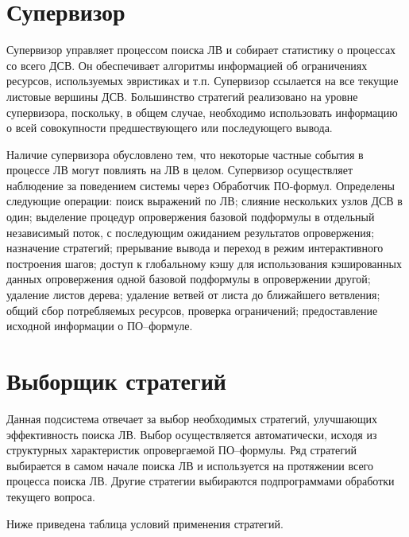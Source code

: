 \section{Супервизор}
Супервизор управляет процессом поиска ЛВ и собирает статистику о процессах со всего ДСВ. Он обеспечивает алгоритмы информацией об ограничениях ресурсов, используемых эвристиках и т.п. Супервизор ссылается на все текущие листовые вершины ДСВ. Большинство стратегий реализовано на уровне супервизора, поскольку, в общем случае, необходимо использовать информацию о всей совокупности предшествующего или последующего вывода.

Наличие супервизора обусловлено тем, что некоторые частные события в процессе ЛВ могут повлиять на ЛВ в целом. Супервизор осуществляет наблюдение за поведением системы через Обработчик ПО-формул. Определены следующие операции: поиск выражений по ЛВ; слияние нескольких узлов ДСВ в один; выделение процедур опровержения базовой подформулы в отдельный независимый поток, с последующим ожиданием результатов опровержения; назначение стратегий; прерывание вывода и переход в режим интерактивного построения шагов; доступ к глобальному кэшу для использования кэшированных данных опровержения одной базовой подформулы в опровержении другой; удаление листов дерева; удаление ветвей от листа до ближайшего ветвления; общий сбор потребляемых ресурсов, проверка ограничений; предоставление исходной информации о ПО--формуле.



\section{Выборщик стратегий}
Данная подсистема отвечает за выбор необходимых стратегий, улучшающих эффективность поиска ЛВ. Выбор осуществляется автоматически, исходя из структурных характеристик опровергаемой ПО--формулы. Ряд стратегий выбирается в самом начале поиска ЛВ и используется на протяжении всего процесса поиска ЛВ. Другие стратегии выбираются подпрограммами обработки текущего вопроса.

Ниже приведена таблица условий применения стратегий.


